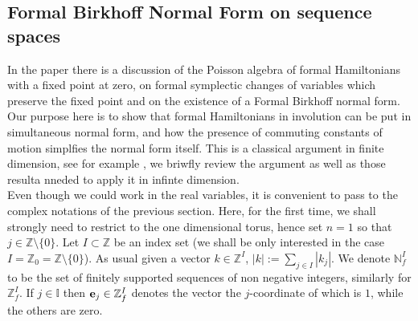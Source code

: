 \documentclass[reqno,11pt]{amsart}
\theoremstyle{plain}
\numberwithin{equation}{section}
\newcommand{\N}{\mathbb{N}}
\newcommand{\Z}{\mathbb{Z}}
\newcommand{\C}{\mathbb{C}}
\newcommand{\be}{{\bf e}}
\newcommand{\pa}[1]{{\left(#1\right)}}
\begin{document}
{\subsection{ Formal Birkhoff  Normal Form on sequence spaces}
In the paper \cite{ProcesiStolo} there is a discussion of the Poisson algebra of formal Hamiltonians with a fixed point at zero, on formal symplectic changes of variables which preserve the fixed point and on the existence of a Formal Birkhoff normal form. Our purpose here is to show that formal Hamiltonians in involution can be put in simultaneous normal form, and how the presence of commuting constants of motion simplfies the normal form itself. This is a classical argument in finite dimension, see for example \cite{Ito1989}, we briwfly review the argument as well as those resulta  nneded to apply it in infinte dimension.
\\
Even though we could work in the real variables, it is convenient to pass to the complex notations of the previous section. Here, for the first time, we shall strongly need to restrict to the one dimensional torus, hence set  $n=1$ so that $j\in \Z\setminus\{0\}$.
Let $I\subset \Z$ be an index set (we shall be only interested in the case $I=\Z_0=\Z\setminus\{0\}$).
As usual given a vector $k\in \Z^I$, $|k|:=\sum_{j\in I}|k_j|$. We denote $\N^I_f$ to be the set of  finitely supported sequences of non negative integers, similarly for $\Z^I_f$. If $j\in\mathbb{I}$ then $\be_j\in \Z^I_f$ denotes the vector the $j$-coordinate of which is  $1$, while the others are zero.

}
\end{document}
